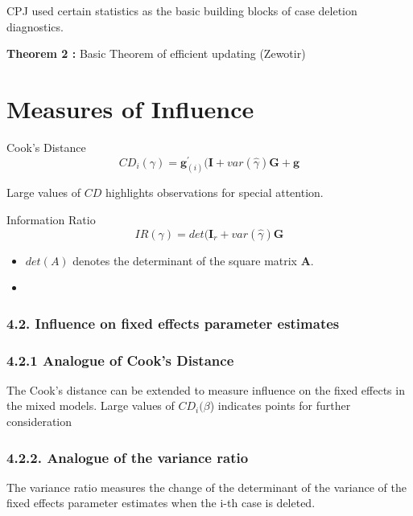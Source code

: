\documentclass[12pt, a4paper]{article}
\begin{document}
CPJ used certain statistics as the basic building blocks of case deletion diagnostics.



\textbf{Theorem 2 :} Basic Theorem of efficient updating (Zewotir)


\section{Measures of Influence}

Cook's Distance
\[  CD_{i}(\gamma) = \boldsymbol{g}^{\prime}_{(i)} ( \boldsymbol{I} + var(\hat{\gamma}) \boldsymbol{G} + \boldsymbol{g}\]

Large values of $CD$ highlights observations for special attention.

Information Ratio
\[ IR(\gamma) = det( \boldsymbol{I}_r + var(\hat{\gamma})\boldsymbol{G} \]

\begin{itemize}
\item $det(A)$ denotes the determinant of the square matrix $\boldsymbol{A}$.
\item
\end{itemize}

\subsubsection*{4.2. Influence on fixed effects parameter estimates}
\subsubsection*{4.2.1 Analogue of Cook’s Distance}
The Cook’s distance can be extended to measure influence on the fixed effects in the mixed models.
Large values of $CD_i(\beta$) indicates points for further consideration
\subsubsection*{4.2.2. Analogue of the variance ratio}

The variance ratio measures the change of the determinant of the variance of the fixed effects parameter estimates when the i-th case is deleted.
\end{document}
